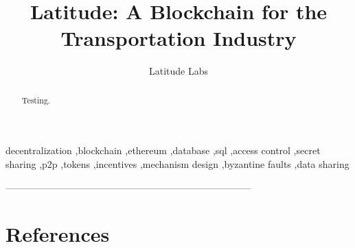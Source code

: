 \documentclass[preprint,10pt]{elsarticle}
\theoremstyle{definition}
\begin{document}
\begin{frontmatter}


\title{Latitude: A Blockchain for the Transportation Industry}

\author{Latitude Labs}
\address{Bay Area, Silicon Valley, California}

\begin{abstract}

    Testing.
\newline
\newline
\newline
\newline
\end{abstract}

\begin{keyword}
	\textsf{decentralization \sep blockchain \sep ethereum \sep database \sep sql \sep access control \sep secret sharing \sep p2p \sep tokens \sep incentives \sep mechanism design \sep byzantine faults \sep data sharing}
\end{keyword}

\end{frontmatter}

\newpage
\tableofcontents
\newpage














%

-----------------------------------------------------------------------------
\section{References}

\end{document}
